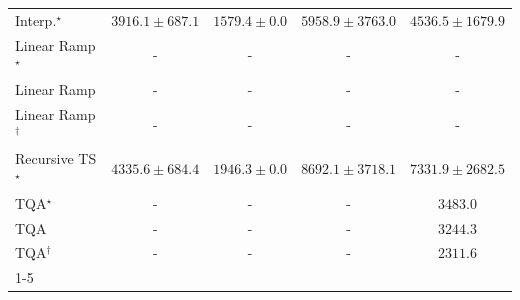 \begin{tabular}{l|cccc|}
Interp.$^\star$ & {\cellcolor[HTML]{B9C6E0}} \color[HTML]{000000} $3916.1\pm 687.1$ & {\cellcolor[HTML]{FFF7FB}} \color[HTML]{000000} $1579.4\pm 0.0$ & {\cellcolor[HTML]{4697C4}} \color[HTML]{F1F1F1} $5958.9\pm 3763.0$ & {\cellcolor[HTML]{9CB9D9}} \color[HTML]{000000} $4536.5\pm 1679.9$ \\
Linear Ramp$^\star$ & {\cellcolor[HTML]{000000}} \color[HTML]{F1F1F1} {\cellcolor{white}} \color{black} - & {\cellcolor[HTML]{000000}} \color[HTML]{F1F1F1} {\cellcolor{white}} \color{black} - & {\cellcolor[HTML]{000000}} \color[HTML]{F1F1F1} {\cellcolor{white}} \color{black} - & {\cellcolor[HTML]{000000}} \color[HTML]{F1F1F1} {\cellcolor{white}} \color{black} - \\
Linear Ramp & {\cellcolor[HTML]{000000}} \color[HTML]{F1F1F1} {\cellcolor{white}} \color{black} - & {\cellcolor[HTML]{000000}} \color[HTML]{F1F1F1} {\cellcolor{white}} \color{black} - & {\cellcolor[HTML]{000000}} \color[HTML]{F1F1F1} {\cellcolor{white}} \color{black} - & {\cellcolor[HTML]{000000}} \color[HTML]{F1F1F1} {\cellcolor{white}} \color{black} - \\
Linear Ramp$^\dagger$ & {\cellcolor[HTML]{000000}} \color[HTML]{F1F1F1} {\cellcolor{white}} \color{black} - & {\cellcolor[HTML]{000000}} \color[HTML]{F1F1F1} {\cellcolor{white}} \color{black} - & {\cellcolor[HTML]{000000}} \color[HTML]{F1F1F1} {\cellcolor{white}} \color{black} - & {\cellcolor[HTML]{000000}} \color[HTML]{F1F1F1} {\cellcolor{white}} \color{black} - \\
Recursive TS$^\star$ & {\cellcolor[HTML]{A7BDDB}} \color[HTML]{000000} $4335.6\pm 684.4$ & {\cellcolor[HTML]{F8F1F8}} \color[HTML]{000000} $1946.3\pm 0.0$ & {\cellcolor[HTML]{034267}} \color[HTML]{F1F1F1} $8692.1\pm 3718.1$ & {\cellcolor[HTML]{056BA7}} \color[HTML]{F1F1F1} $7331.9\pm 2682.5$ \\
TQA$^\star$ & {\cellcolor[HTML]{000000}} \color[HTML]{F1F1F1} {\cellcolor{white}} \color{black} - & {\cellcolor[HTML]{000000}} \color[HTML]{F1F1F1} {\cellcolor{white}} \color{black} - & {\cellcolor[HTML]{000000}} \color[HTML]{F1F1F1} {\cellcolor{white}} \color{black} - & {\cellcolor[HTML]{CDD0E5}} \color[HTML]{000000} $3483.0$ \\
TQA & {\cellcolor[HTML]{000000}} \color[HTML]{F1F1F1} {\cellcolor{white}} \color{black} - & {\cellcolor[HTML]{000000}} \color[HTML]{F1F1F1} {\cellcolor{white}} \color{black} - & {\cellcolor[HTML]{000000}} \color[HTML]{F1F1F1} {\cellcolor{white}} \color{black} - & {\cellcolor[HTML]{D6D6E9}} \color[HTML]{000000} $3244.3$ \\
TQA$^\dagger$ & {\cellcolor[HTML]{000000}} \color[HTML]{F1F1F1} {\cellcolor{white}} \color{black} - & {\cellcolor[HTML]{000000}} \color[HTML]{F1F1F1} {\cellcolor{white}} \color{black} - & {\cellcolor[HTML]{000000}} \color[HTML]{F1F1F1} {\cellcolor{white}} \color{black} - & {\cellcolor[HTML]{F0EAF4}} \color[HTML]{000000} $2311.6$ \\
\cline{1-5}
\bottomrule
\end{tabular}
